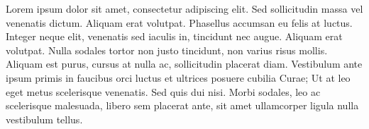 Lorem ipsum dolor sit amet, consectetur adipiscing elit. Sed sollicitudin massa vel venenatis dictum. Aliquam erat volutpat. Phasellus accumsan eu felis at luctus. Integer neque elit, venenatis sed iaculis in, tincidunt nec augue. Aliquam erat volutpat. Nulla sodales tortor non justo tincidunt, non varius risus mollis. Aliquam est purus, cursus at nulla ac, sollicitudin placerat diam. Vestibulum ante ipsum primis in faucibus orci luctus et ultrices posuere cubilia Curae; Ut at leo eget metus scelerisque venenatis. Sed quis dui nisi. Morbi sodales, leo ac scelerisque malesuada, libero sem placerat ante, sit amet ullamcorper ligula nulla vestibulum tellus.
